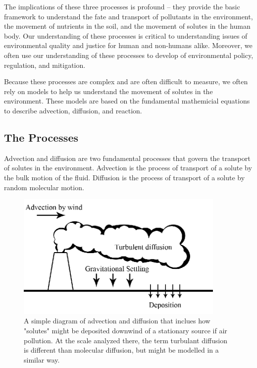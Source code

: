 \documentclass{tufte-handout}\usepackage[]{graphicx}\usepackage[]{xcolor}
\begin{document}
The implications of these three processes is profound -- they provide the basic framework to understand the fate and transport of pollutants in the environment, the movement of nutrients in the soil, and the movement of solutes in the human body. Our understanding of these processes is critical to understanding issues of environmental quality and justice for human and non-humans alike. Moreover, we often use our understanding of these processes to develop of environmental policy, regulation, and mitigation.

Because these processes are complex and are often difficult to measure, we often rely on models to help us understand the movement of solutes in the environment. These models are based on the fundamental mathemicial equations to describe advection, diffusion, and reaction.

\subsection{The Processes}

Advection and diffusion are two fundamental processes that govern the transport of solutes in the environment. Advection is the process of transport of a solute by the bulk motion of the fluid. Diffusion is the process of transport of a solute by random molecular motion.

\begin{figure}[h]
\centering
\includegraphics[width=0.9\textwidth]{graphics/Diagram-advection-diffusion.png}
\caption{A simple diagram of advection and diffusion that inclues how "solutes" might be deposited downwind of a stationary source if air pollution. At the scale analyzed there, the term turbulant diffusion is different than molecular diffusion, but might be modelled in a similar way.}
\label{fig:advection-diffusion}
\end{figure}
\end{document}
